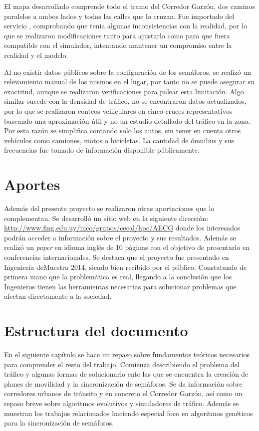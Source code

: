 El mapa desarrollado comprende todo el tramo del Corredor Garzón, dos caminos paralelos a ambos lados y todas las calles que lo cruzan. Fue importado del servicio \citep{OSM}, comprobando que tenia algunas inconsistencias con la realidad, por lo que se realizaron modificaciones tanto para ajustarlo como para que fuera compatible con el simulador, intentando mantener un compromiso entre la realidad y el modelo. 

Al no existir datos públicos sobre la configuración de los semáforos, se realizó un relevamiento manual de los mismos en el lugar, por tanto no se puede asegurar su exactitud, aunque se realizaron verificaciones para palear esta limitación. Algo similar sucede con la densidad de tráfico, no se encontraron datos actualizados, por lo que se realizaron conteos vehiculares en cinco cruces representativos buscando una aproximación útil y no un estudio detallado del tráfico en la zona. Por esta razón se simplifica contando solo los autos, sin tener en cuenta otros vehículos como camiones, motos o bicicletas. La cantidad de ómnibus y sus frecuencias fue tomado de información disponible públicamente.


\section{Aportes}
Además del presente proyecto se realizaron otras aportaciones que lo complementan. Se desarrolló un sitio web en la siguiente dirección: \url{http://www.fing.edu.uy/inco/grupos/cecal/hpc/AECG} donde los interesados podrán acceder a información sobre el proyecto y sus resultados. Además se realizó un \emph{paper} en idioma inglés de 10 páginas con el objetivo de presentarlo en conferencias internacionales. Se destaca que el proyecto fue presentado en Ingeniería deMuestra 2014, siendo bien recibido por el público. Constatando de primera mano que la problemática es real, llegando a la conclusión que los Ingenieros tienen las herramientas necesarias para solucionar problemas que afectan directamente a la sociedad.


\section{Estructura del documento}
En el siguiente capítulo se hace un repaso sobre fundamentos teóricos necesarios para comprender el resto del trabajo. Comienza describiendo el problema del tráfico y algunas formas de solucionarlo ente las que se encuentra la creación de planes de movilidad y la sincronización de semáforos. Se da información sobre corredores urbanos de tránsito y en concreto el Corredor Garzón, así como un repaso breve sobre algoritmos evolutivos y simuladores de tráfico. Además se muestran los trabajos relacionados haciendo especial foco en algoritmos genéticos para la sincronización de semáforos.

